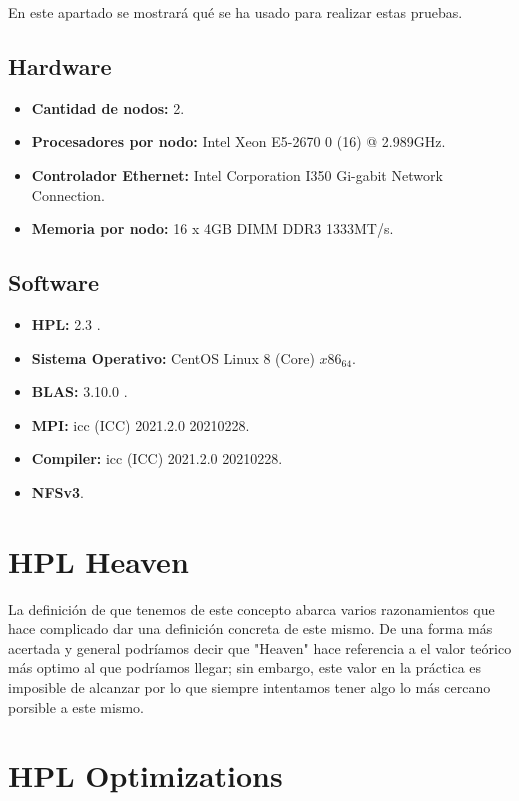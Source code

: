 \documentclass[conference]{IEEEtran}
\begin{document}
En este apartado se mostrará qué se ha usado para realizar estas pruebas.

\subsection{Hardware}

\begin{itemize}
    \item \textbf{Cantidad de nodos:} 2.
    \item \textbf{Procesadores por nodo:} Intel Xeon E5-2670 0 (16) @ 2.989GHz.
    \item \textbf{Controlador Ethernet:} Intel Corporation I350 Gi-gabit Network Connection.
    \item \textbf{Memoria por nodo:} 16 x 4GB DIMM DDR3 1333MT/s.
\end{itemize}

\subsection{Software}

\begin{itemize}
    \item \textbf{HPL:} 2.3 \cite{1}.
    \item \textbf{Sistema Operativo:} CentOS Linux 8 (Core) \(x86_64\).
    \item \textbf{BLAS:} 3.10.0 \cite{2}.
    \item \textbf{MPI:} icc (ICC) 2021.2.0 20210228.
    \item \textbf{Compiler:} icc (ICC) 2021.2.0 20210228.
    \item \textbf{NFSv3}.
\end{itemize}

\section{HPL Heaven}
La definición de que tenemos de este concepto abarca varios razonamientos
que hace complicado dar una definición concreta de este mismo. De una forma 
más acertada y general podríamos decir que "Heaven" hace referencia a el valor teórico 
más optimo al que podríamos llegar; sin embargo, este valor en la práctica es imposible 
de alcanzar por lo que siempre intentamos tener algo lo más cercano porsible a este mismo.

\section{HPL Optimizations}
\end{document}
